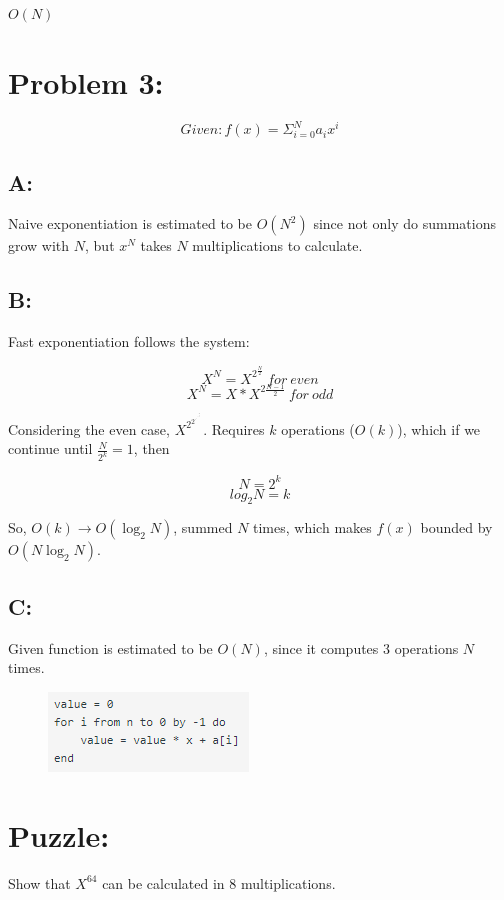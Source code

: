 \documentclass[journal]{IEEEtran}
\begin{document}
$\boxed{O(N)}$


\section{Problem 3:}

$$Given: f(x) = \Sigma_{i=0}^{N} a_i x^i$$ 

\subsection*{A:}
Naive exponentiation is estimated to be $\boxed{O(N^2)}$ since not only do summations grow with $N$, but $x^N$
takes $N$ multiplications to calculate. 

\subsection*{B:}
Fast exponentiation follows the system: 

$$X^N = X^{2^{\frac{N}{2}}}~for~even$$
$$X^N = X*X^{2{\frac{N-1}{2}}}~for~odd$$

Considering the even case, $X^{2^{2^{.^{.^{.^{\frac{N}{2^k}}}}}}}$. Requires $k$ 
operations ($O(k)$), which if we continue until $\frac{N}{2^k} = 1$, then 

$$N = 2^k$$
$$log_2 N = k$$

So, $O(k) \rightarrow O(\log_2 N)$, summed $N$ times, which makes $f(x)$ bounded by
$\boxed{O(N \log_2 N)}$.

\subsection*{C:}
Given function is estimated to be $O(N)$, since it computes 3 operations $N$ times.

\begin{figure}[h!]
	\includegraphics[scale = 1]{F4.PNG}
	\caption{}
\end{figure}

\section{Puzzle:}

Show that $X^{64}$ can be calculated in $8$ multiplications.
\end{document}
